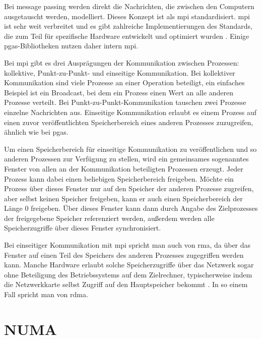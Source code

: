 Bei \gls{message passing} werden direkt die Nachrichten,
die zwischen den Computern ausgetauscht werden,
modelliert.
Dieses Konzept ist als \gls{mpi} \cite{MPI-3.1} standardisiert.
\Gls{mpi} ist sehr weit verbreitet und es gibt zahlreiche Implementierungen des Standards,
die zum Teil für spezifische Hardware entwickelt und optimiert wurden \cite{foMPI}.
Einige \gls{pgas}-Bibliotheken nutzen daher intern \gls{mpi}.

Bei \gls{mpi} gibt es drei Ausprägungen der Kommunikation zwischen Prozessen:
kollektive, Punkt-zu-Punkt- und einseitige Kommunikation.
Bei kollektiver Kommunikation sind viele Prozesse an einer Operation beteiligt,
ein einfaches Beispiel ist ein Broadcast,
bei dem ein Prozess einen Wert an alle anderen Prozesse verteilt.
Bei Punkt-zu-Punkt-Kommunikation tauschen zwei Prozesse einzelne Nachrichten aus.
Einseitige Kommunikation erlaubt es einem Prozess auf einen zuvor veröffentlichten Speicherbereich eines anderen Prozesses zuzugreifen,
ähnlich wie bei \gls{pgas}.

Um einen Speicherbereich für einseitige Kommunikation zu veröffentlichen und so anderen Prozessen zur Verfügung zu stellen,
wird ein gemeinsames sogenanntes \gls{Fenster} von allen an der Kommunikation beteiligten Prozessen erzeugt.
Jeder Prozess kann dabei einen beliebigen Speicherbereich freigeben.
Möchte ein Prozess über dieses \gls{Fenster} nur auf den Speicher der anderen Prozesse zugreifen,
aber selbst keinen Speicher freigeben,
kann er auch einen Speicherbereich der Länge 0 freigeben.
Über dieses \gls{Fenster} kann dann durch Angabe des Zielprozesses der freigegebene Speicher referenziert werden,
außerdem werden alle Speicherzugriffe über dieses \gls{Fenster} synchronisiert.

Bei einseitiger Kommunikation mit \gls{mpi} spricht man auch von \gls{rma},
da über das \gls{Fenster} auf einen Teil des Speichers des anderen Prozesses zugegriffen werden kann.
Manche Hardware erlaubt solche Speicherzugriffe über das Netzwerk sogar ohne Beteiligung des Betriebssystems auf dem Zielrechner,
typischerweise indem die Netzwerkkarte selbst Zugriff auf den Hauptspeicher bekommt \cite{Gemini} \cite{InfiniBand} \cite{PERCS} \cite{RoCE}.
In so einem Fall spricht man von \gls{rdma}.

\section{NUMA}
\label{sec:numa}

